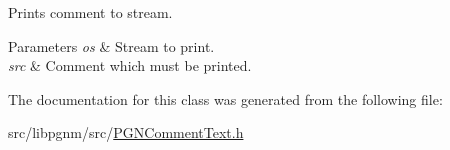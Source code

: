 Prints comment to stream. 


\begin{DoxyParams}{Parameters}
{\em os} & Stream to print. \\
\hline
{\em src} & Comment which must be printed. \\
\hline
\end{DoxyParams}


The documentation for this class was generated from the following file:\begin{DoxyCompactItemize}
\item 
src/libpgnm/src/\hyperlink{PGNCommentText_8h}{PGNCommentText.h}\end{DoxyCompactItemize}
